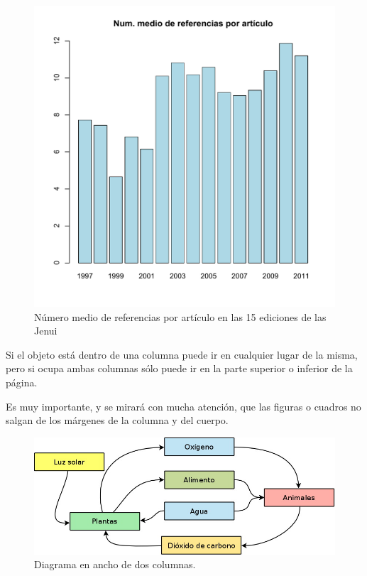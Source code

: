 \documentclass[twocolumn,twoside,a4paper, 10pt]{article}
\begin{document}
\begin{figure}[htbp]
\centerline{\includegraphics[width=\linewidth]{mediaref}}
\caption{\label{fig:medias} Número medio de referencias por artículo en las 15 ediciones de las Jenui} 
\label{fig:mxm_peco} 
\end{figure}

Si el objeto está dentro de una columna puede ir en cualquier lugar 
de la misma, pero si ocupa ambas columnas sólo puede ir en la parte 
superior o inferior de la página.

Es muy importante, y se mirará con mucha atención, que las figuras o 
cuadros no salgan de los márgenes de la columna y del cuerpo.
\begin{figure}
	\begin{center}
	\includegraphics[width = 0.8\linewidth]{diagrLargo.jpg}
	\end{center}
	\caption{Diagrama en ancho de dos columnas.}
\end{figure}
\end{document}
